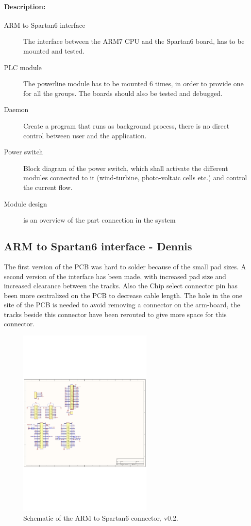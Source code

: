 \paragraph{Description:}
\begin{description}
	\item[ARM to Spartan6 interface] The interface between the ARM7 CPU and the Spartan6 board, has to be mounted and tested. 
	\item[PLC module] The powerline module has to be mounted 6 times, in order to provide one for all the groups. The boards should also be tested and debugged.
	\item[Daemon]  Create a program that runs as background process, there is no direct control between user and the application.
	\item[Power switch] Block diagram of the power switch, which shall activate the different modules connected to it (wind-turbine, photo-voltaic cells etc.) and control the current flow.
	\item[Module design] is an overview of the part connection in the system
\end{description}

\subsection{ARM to Spartan6 interface - Dennis}
The first version of the PCB was hard to solder because of the small pad sizes. A second version of the interface has been made, with increased pad size and increased clearance between the tracks. Also the Chip select connector pin has been more centralized on the PCB to decrease cable length. The hole in the one site of the PCB is needed to avoid removing a connector on the arm-board, the tracks beside this connector have been rerouted to give more space for this connector. 
\begin{figure}[H]
	\begin{centering}
		 \includegraphics[width=0.60\textwidth,page=1]{images/dig_to_ea_v0_2}
		\caption{Schematic of the ARM to Spartan6 connector, v0.2.}
	\end{centering}
\end{figure}

